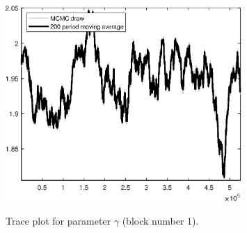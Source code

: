 \begin{figure}[H]
\centering
  \includegraphics[width=0.8\textwidth]{BRS_growth_KPR/graphs/TracePlot_gam_blck_1}\\
    \caption{Trace plot for parameter ${\gamma}$ (block number 1).}
\end{figure}
